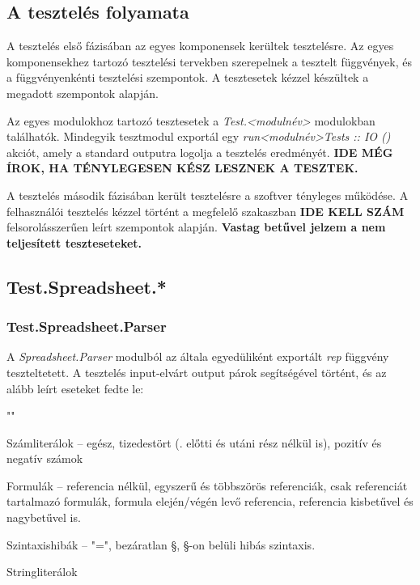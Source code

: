 \subsection{A tesztelés folyamata}

A tesztelés első fázisában az egyes komponensek kerültek tesztelésre. Az egyes komponensekhez tartozó tesztelési tervekben szerepelnek a tesztelt függvények, és a függvényenkénti tesztelési szempontok. A tesztesetek kézzel készültek a megadott szempontok alapján. 

Az egyes modulokhoz tartozó tesztesetek a \textit{Test.<modulnév>} modulokban találhatók. Mindegyik tesztmodul exportál egy \textit{run<modulnév>Tests :: IO ()} akciót, amely a standard outputra logolja a tesztelés eredményét. \textbf{IDE MÉG ÍROK, HA TÉNYLEGESEN KÉSZ LESZNEK A TESZTEK.}

A tesztelés második fázisában került tesztelésre a szoftver tényleges működése. A felhasználói tesztelés kézzel történt a megfelelő szakaszban \textbf{IDE KELL SZÁM} felsorolásszerűen leírt szempontok alapján. \textbf{Vastag betűvel jelzem a nem teljesített teszteseteket.}

\subsection{Test.Spreadsheet.*}

\subsubsection{Test.Spreadsheet.Parser}

A \textit{Spreadsheet.Parser} modulból az általa egyedüliként exportált \textit{rep} függvény teszteltetett. A tesztelés input-elvárt output párok segítségével történt, és az alább leírt eseteket fedte le:

\begin{compactenum}
	\item ""
	\item Számliterálok -- egész, tizedestört (. előtti és utáni rész nélkül is), pozitív és negatív számok
	\item Formulák -- referencia nélkül, egyszerű és többszörös referenciák, csak referenciát tartalmazó formulák, formula elején/végén levő referencia, referencia kisbetűvel és nagybetűvel is.
	\item Szintaxishibák -- "=", bezáratlan §, §-on belüli hibás szintaxis.
	\item Stringliterálok
\end{compactenum}

